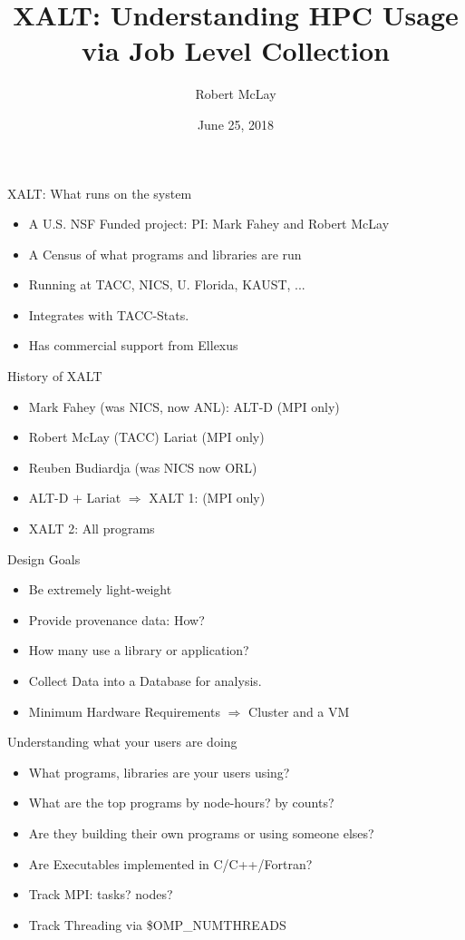 \documentclass{beamer}
\begin{document}
\title[XALT]{XALT: Understanding HPC Usage via Job Level Collection}
\author{Robert McLay} 
\date{June 25, 2018} 

\frame{\titlepage} 

\begin{frame}{XALT: What runs on the system}
  \begin{itemize}
    \item A U.S. NSF Funded project: PI: Mark Fahey and Robert McLay
    \item A Census of what programs and libraries are run
    \item Running at TACC, NICS, U. Florida, KAUST, ...
    \item Integrates with TACC-Stats.
    \item Has commercial support from Ellexus 
  \end{itemize}
\end{frame}

\begin{frame}{History of XALT}
  \begin{itemize}
    \item Mark Fahey (was NICS, now ANL): ALT-D (MPI only)
    \item Robert McLay (TACC) Lariat (MPI only)
    \item Reuben Budiardja (was NICS now ORL)
    \item ALT-D $+$ Lariat $\Rightarrow$ XALT 1: (MPI only)
    \item XALT 2: All programs
  \end{itemize}
\end{frame}

\begin{frame}{Design Goals}
  \begin{itemize}
    \item Be extremely light-weight
    \item Provide provenance data: How?
    \item How many use a library or application?
    \item Collect Data into a Database for analysis.
    \item Minimum Hardware Requirements $\Rightarrow$ Cluster and a VM
  \end{itemize}
\end{frame}

\begin{frame}{Understanding what your users are doing}
  \begin{itemize}
    \item What programs, libraries are your users using?
    \item What are the top programs by node-hours? by counts?
    \item Are they building their own programs or using someone elses?
    \item Are Executables implemented in C/C++/Fortran?
    \item Track MPI: tasks? nodes?
    \item Track Threading via \$OMP\_NUMTHREADS
  \end{itemize}
\end{frame}
\end{document}
